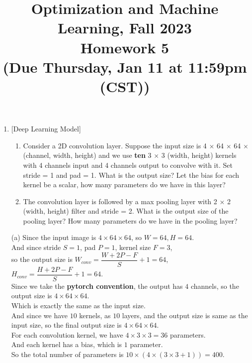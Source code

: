 \documentclass[10pt]{article}
\begin{document}
\date{}
\title{Optimization and Machine Learning, Fall 2023 \\
	Homework 5 \\
	\small (Due Thursday, Jan 11 at 11:59pm (CST))}
\maketitle
\begin{enumerate}[1.]

	\item {} [Deep Learning Model]
	\begin{enumerate}
		\item Consider a 2D convolution layer. Suppose the input size is 4 $\times$ 64 $\times$ 64 $\times$ (channel, width, height) and
		we use \textbf{ten} 3 $\times$ 3 (width, height) kernels with 4 channels input and 4 channels output to convolve with it. Set stride = 1 and pad = 1. What is 
		the output size? Let the bias for each kernel be a scalar, how many parameters do we have in this layer? 
		\item The convolution layer is followed by a max pooling layer with 2 × 2 (width, height) filter and stride
		= 2. What is the output size of the pooling layer? How many parameters do we have in the pooling
		layer? 
	\end{enumerate}
	
(a) Since the input image is $4\times 64\times 64$, so $W=64,H=64$.\\
And since stride $S=1$, pad $P=1$, kernel size $F=3$,\\
so the output size is $W_{conv}=\dfrac{W+2P-F}{S}+1=64$, $H_{conv}=\dfrac{H+2P-F}{S}+1=64$.\\
Since we take the \textbf{pytorch convention}, the output has $4$ channels, so the output size is $4\times 64\times 64$.\\
Which is exactly the same as the input size.\\
And since we have $10$ kernels, as $10$ layers, and the output size is same as the input size, so the final output size is $4\times 64\times 64$.\\

For each convolution kernel, we have $4\times 3\times 3=36$ parameters.\\
And each kernel has a bias, which is $1$ parameter.\\
So the total number of parameters is $10\times (4\times(3\times 3+1))=400$.\\


\end{enumerate}
\end{document}
